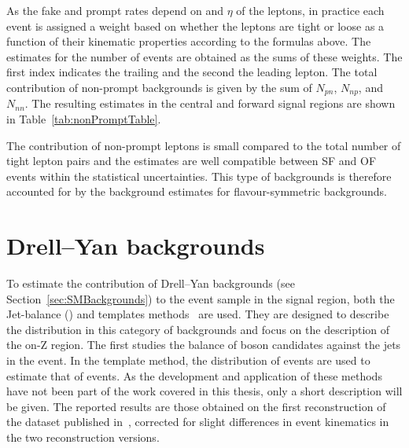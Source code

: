 As the fake and prompt rates depend on \pt and $\eta$ of the leptons, in practice each event is assigned a weight based on whether the leptons are tight or loose as a function of their kinematic properties according to the formulas above. The estimates for the number of events are obtained as the sums of these weights. The first index indicates the trailing and the second the leading lepton. The total contribution of non-prompt backgrounds is given by the sum of $N_{pn}$, $N_{np}$, and $N_{nn}$. The resulting estimates in the central and forward signal regions are shown in Table~\ref{tab:nonPromptTable}. 

The contribution of non-prompt leptons is small compared to the total number of tight lepton pairs and the estimates are well compatible between SF and OF events within the statistical uncertainties. This type of backgrounds is therefore accounted for by the background estimates for flavour-symmetric backgrounds.

\section{Drell--Yan backgrounds}
To estimate the contribution of Drell--Yan backgrounds (see Section~\ref{sec:SMBackgrounds}) to the event sample in the signal region, both the Jet-\Z balance (\JZB) and \MET templates methods~\cite{Chatrchyan:2012qka} are used. They are designed to describe the \MET distribution in this category of backgrounds and focus on the description of the on-Z region. The first studies the balance of \Z boson candidates against the jets in the event. In the \MET template method, the \MET distribution of \gjets events are used to estimate that of \zjets events. As the development and application of these methods have not been part of the work covered in this thesis, only a short description will be given. The reported results are those obtained on the first reconstruction of the dataset published in~\cite{Khachatryan:2015lwa}, corrected for slight differences in event kinematics in the two reconstruction versions. 
